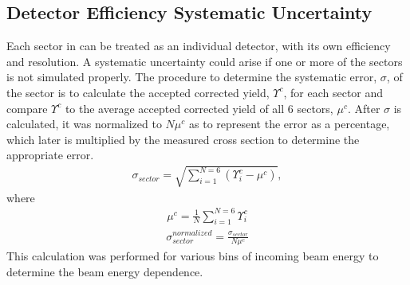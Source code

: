  			\subsection{Detector Efficiency Systematic Uncertainty}
 			Each sector in  can be treated as an individual detector, with its own efficiency and resolution. A systematic uncertainty could arise if one or more of the sectors is not simulated properly. The procedure to determine the systematic error, $\sigma$, of the sector is to calculate the accepted corrected yield, $\Upsilon^c$, for each sector and compare $\Upsilon^c$ to the average accepted corrected yield of all 6 sectors, $\mu^c$. After $\sigma$ is calculated, it was normalized to $N \mu^c$ as to represent the error as a percentage, which later is multiplied by the measured cross section to determine the appropriate error. 
 			\begin{align}
 				\sigma_{sector} = \sqrt{\sum_{i=1}^{N = 6}\left(\Upsilon_i^c - \mu^c\right)},
 			\end{align}
 			where
 			\begin{align}
 				\mu^c = \frac{1}{N}\sum_{i=1}^{N=6}\Upsilon_i^c
 			\end{align}
 			\begin{align}
 				\sigma_{sector}^{normalized} = \frac{\sigma_{sector}}{N\mu^c}
 			\end{align}
 			This calculation was performed for various bins of incoming beam energy to determine the beam energy dependence.%
 			

